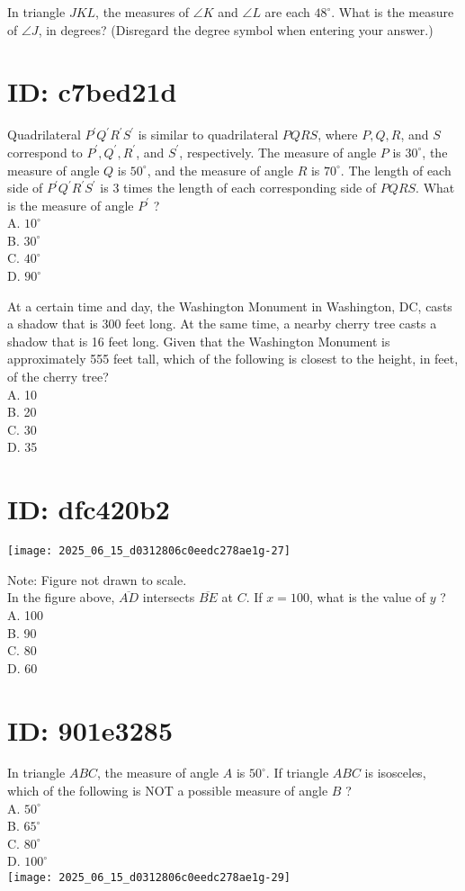 In triangle $J K L$, the measures of $\angle K$ and $\angle L$ are each $48^{\circ}$. What is the measure of $\angle J$, in degrees? (Disregard the degree symbol when entering your answer.)

\section*{ID: c7bed21d}
Quadrilateral $P^{\prime} Q^{\prime} R^{\prime} S^{\prime}$ is similar to quadrilateral $P Q R S$, where $P, Q, R$, and $S$ correspond to $P^{\prime}, Q^{\prime}, R^{\prime}$, and $S^{\prime}$, respectively. The measure of angle $P$ is $30^{\circ}$, the measure of angle $Q$ is $50^{\circ}$, and the measure of angle $R$ is $70^{\circ}$. The length of each side of $P^{\prime} Q^{\prime} R^{\prime} S^{\prime}$ is 3 times the length of each corresponding side of $P Q R S$. What is the measure of angle $P^{\prime}$ ?\\
A. $10^{\circ}$\\
B. $30^{\circ}$\\
C. $40^{\circ}$\\
D. $90^{\circ}$

At a certain time and day, the Washington Monument in Washington, DC, casts a shadow that is 300 feet long. At the same time, a nearby cherry tree casts a shadow that is 16 feet long. Given that the Washington Monument is approximately 555 feet tall, which of the following is closest to the height, in feet, of the cherry tree?\\
A. 10\\
B. 20\\
C. 30\\
D. 35

\section*{ID: dfc420b2}
\begin{center}
\texttt{[image: 2025\_06\_15\_d0312806c0eedc278ae1g-27]}
\end{center}

Note: Figure not drawn to scale.\\
In the figure above, $\overline{A D}$ intersects $\overline{B E}$ at $C$. If $x=100$, what is the value of $y$ ?\\
A. 100\\
B. 90\\
C. 80\\
D. 60

\section*{ID: 901e3285}
In triangle $A B C$, the measure of angle $A$ is $50^{\circ}$. If triangle $A B C$ is isosceles, which of the following is NOT a possible measure of angle $B$ ?\\
A. $50^{\circ}$\\
B. $65^{\circ}$\\
C. $80^{\circ}$\\
D. $100^{\circ}$\\
\texttt{[image: 2025\_06\_15\_d0312806c0eedc278ae1g-29]}

